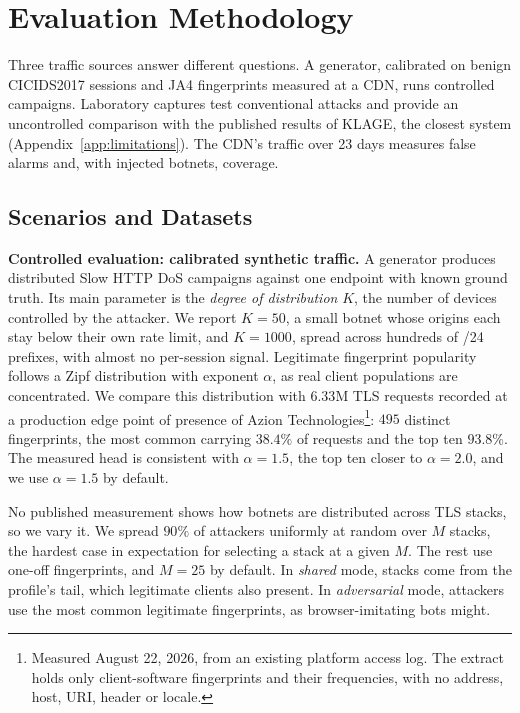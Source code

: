 \documentclass[conference,letterpaper,10pt]{IEEEtran}
\newcommand\1{\textit{(i)}}
\newcommand\2{\textit{(ii)}}
\newcommand\3{\textit{(iii)}}
\newcommand\4{\textit{(iv)}}
\newcommand\5{\textit{(v)}}
\newcommand\6{\textit{(vi)}}
\newcommand\7{\textit{(vii)}}
\newcommand\8{\textit{(viii)}}
\newcommand\9{\textit{(ix)}}
\begin{document}
\section{Evaluation Methodology}
\label{sec:method}

Three traffic sources answer different questions.
A generator, calibrated on benign CICIDS2017 sessions and
JA4 fingerprints measured at a CDN, runs controlled
campaigns. Laboratory captures test conventional attacks
and provide an uncontrolled comparison with the published
results of KLAGE, the closest system
(Appendix~\ref{app:limitations}). The CDN's traffic over 23
days measures false alarms and, with injected botnets,
coverage.

\subsection{Scenarios and Datasets}

\textbf{Controlled evaluation: calibrated synthetic traffic.}
A generator produces distributed Slow HTTP DoS campaigns
against one endpoint with known ground truth. Its main
parameter is the \textit{degree of distribution} $K$, the
number of devices controlled by the attacker. We report $K =
50$, a small botnet whose origins each stay below their own
rate limit, and $K = 1000$, spread across hundreds of /24
prefixes, with almost no per-session signal. Legitimate
fingerprint popularity follows a
Zipf distribution with exponent $\alpha$, as real client
populations are concentrated.
We compare this distribution with $6.33$M TLS requests
recorded at a production edge point of presence of
Azion Technologies\footnote{Measured August 22, 2026,
from an existing platform access log. The extract holds only
client-software fingerprints and their frequencies, with no
address, host, URI, header or locale.}: $495$ distinct
fingerprints,
the most common carrying $38.4\%$ of requests and the top
ten $93.8\%$. The measured head is consistent with $\alpha =
1.5$, the top ten closer to $\alpha = 2.0$, and we use
$\alpha = 1.5$ by default.

No published measurement shows how botnets are distributed
across TLS stacks, so we vary it.
We spread $90\%$ of attackers uniformly at random over $M$
stacks, the hardest case in expectation for selecting a
stack at a given $M$. The rest use one-off
fingerprints, and $M = 25$ by default.
In \textit{shared} mode, stacks come from the profile's
tail, which legitimate clients also present.
In \textit{adversarial} mode, attackers use the most
common legitimate fingerprints, as browser-imitating
bots might.
\end{document}
